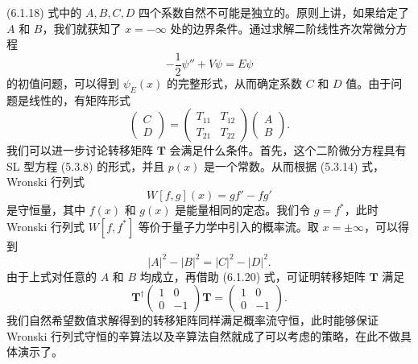 (6.1.18) 式中的 $A,B,C,D$ 四个系数自然不可能是独立的。原则上讲，如果给定了 $A$ 和 $B$，我们就获知了 $x=-\infty$ 处的边界条件。通过求解二阶线性齐次常微分方程
\begin{equation}
 -\frac12\psi''+V\psi=E\psi
\tag{6.1.19}
\end{equation}
的初值问题，可以得到 $\psi_E(x)$ 的完整形式，从而确定系数 $C$ 和 $D$ 值。由于问题是线性的，有矩阵形式
\begin{equation}
 \begin{pmatrix}C\\D\end{pmatrix}
 =\begin{pmatrix}T_{11}&T_{12}\\T_{21}&T_{22}\end{pmatrix}
 \begin{pmatrix}A\\B\end{pmatrix}.
\tag{6.1.20}
\end{equation}
我们可以进一步讨论转移矩阵 $\mathbf T$ 会满足什么条件。首先，这个二阶微分方程具有 SL 型方程 (5.3.8) 的形式，并且 $p(x)$ 是一个常数。从而根据 (5.3.14) 式，Wronski 行列式
\begin{equation}
 W[f,g](x)=gf'-fg'
\tag{6.1.21}
\end{equation}
是守恒量，其中 $f(x)$ 和 $g(x)$ 是能量相同的定态。我们令 $g=f^*$，此时Wronski 行列式 $W[f,f^*]$ 等价于量子力学中引入的概率流。取 $x=\pm\infty$，可以得到
\begin{equation}
 |A|^2-|B|^2=|C|^2-|D|^2.
\tag{6.1.22}
\end{equation}
由于上式对任意的 $A$ 和 $B$ 均成立，再借助 (6.1.20) 式，可证明转移矩阵 $\mathbf T$ 满足
\begin{equation}
 \mathbf T^\dagger
 \begin{pmatrix}1&0\\0&-1\end{pmatrix}
 \mathbf T=
 \begin{pmatrix}1&0\\0&-1\end{pmatrix}.
\tag{6.1.23}
\end{equation}
我们自然希望数值求解得到的转移矩阵同样满足概率流守恒，此时能够保证Wronski 行列式守恒的辛算法以及辛算法自然就成了可以考虑的策略，在此不做具体演示了。

